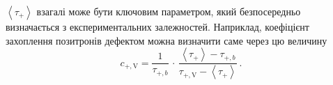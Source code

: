 \documentclass[10pt,a5paper,titlepage,oneside]{book}
\numberwithin{equation}{part}
\begin{document}
$\left\langle\tau_+\right\rangle$ взагалі може бути ключовим параметром,
який безпосередньо визначається з експериментальних залежностей.
Наприклад, коефіцієнт захоплення позитронів дефектом можна визначити саме через цю величину
\begin{equation*}
c_{+,\mathrm{V}}=\frac{1}{\tau_{+,b}}\,\cdot\,\frac{\left\langle\tau_+\right\rangle-\tau_{+,b}}{\tau_{+,\mathrm{V}}-\left\langle\tau_+\right\rangle}\,.
\end{equation*}







\end{document}
